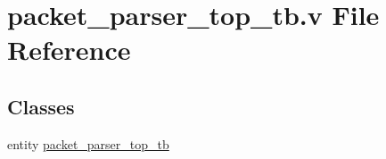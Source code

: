 \hypertarget{packet__parser__top__tb_8v}{}\section{packet\+\_\+parser\+\_\+top\+\_\+tb.\+v File Reference}
\label{packet__parser__top__tb_8v}
\subsection*{Classes}
\begin{DoxyCompactItemize}
\item 
entity \mbox{\hyperlink{enumpacket__parser__top__tb}{packet\+\_\+parser\+\_\+top\+\_\+tb}}
\end{DoxyCompactItemize}
